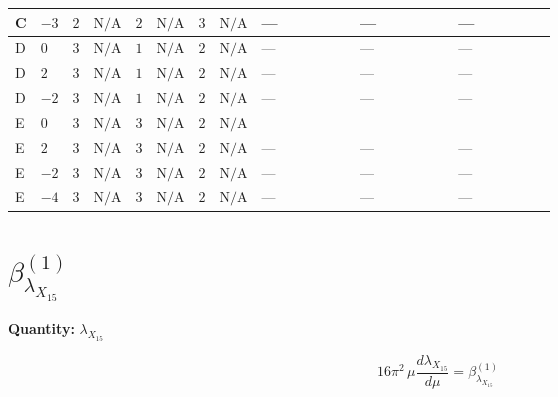 \documentclass[8pt]{article}
\begin{document}
\begin{landscape}
\begin{longtable}{@{}llcccccc >{\raggedright\arraybackslash}p{0.21\linewidth} >{\raggedright\arraybackslash}p{0.21\linewidth} >{\raggedright\arraybackslash}p{0.21\linewidth}@{}}
\midrule
C & $-3$ & $2$ & $\text{N/A}$ & $2$ & $\text{N/A}$ & $3$ & $\text{N/A}$ & --- & --- & --- \\
\midrule
D & $0$ & $3$ & $\text{N/A}$ & $1$ & $\text{N/A}$ & $2$ & $\text{N/A}$ & --- & --- & --- \\
\midrule
D & $2$ & $3$ & $\text{N/A}$ & $1$ & $\text{N/A}$ & $2$ & $\text{N/A}$ & --- & --- & --- \\
\midrule
D & $-2$ & $3$ & $\text{N/A}$ & $1$ & $\text{N/A}$ & $2$ & $\text{N/A}$ & --- & --- & --- \\
\midrule
E & $0$ & $3$ & $\text{N/A}$ & $3$ & $\text{N/A}$ & $2$ & $\text{N/A}$ & \scriptsize\adjustbox{max width=\linewidth}{$\begin{gathered} -2 {\lambda_{12}^{(\times)}} {\lambda_{X_{14}}}\end{gathered}$} & \scriptsize\adjustbox{max width=\linewidth}{$\begin{gathered} -\frac{4 {\lambda_{HS_1}^{(A)}} {\lambda_{X_{14}}}}{3}\end{gathered}$} & \scriptsize\adjustbox{max width=\linewidth}{$\begin{gathered} -\frac{4 {\lambda_{HS_2}^{(A)}} {\lambda_{X_{14}}}}{3}\end{gathered}$} \\
\midrule
E & $2$ & $3$ & $\text{N/A}$ & $3$ & $\text{N/A}$ & $2$ & $\text{N/A}$ & --- & --- & --- \\
\midrule
E & $-2$ & $3$ & $\text{N/A}$ & $3$ & $\text{N/A}$ & $2$ & $\text{N/A}$ & --- & --- & --- \\
\midrule
E & $-4$ & $3$ & $\text{N/A}$ & $3$ & $\text{N/A}$ & $2$ & $\text{N/A}$ & --- & --- & --- \\
\midrule
\bottomrule
\end{longtable}
\clearpage
\section*{$\beta_{{\lambda_{X_{15}}}}^{(1)}$}
\noindent\textbf{Quantity: }${\lambda_{X_{15}}}$\par\smallskip
\[16\pi^2\,\mu\frac{d {\lambda_{X_{15}}}}{d\mu}=\beta_{{\lambda_{X_{15}}}}^{(1)}\]

\end{landscape}
\end{document}
